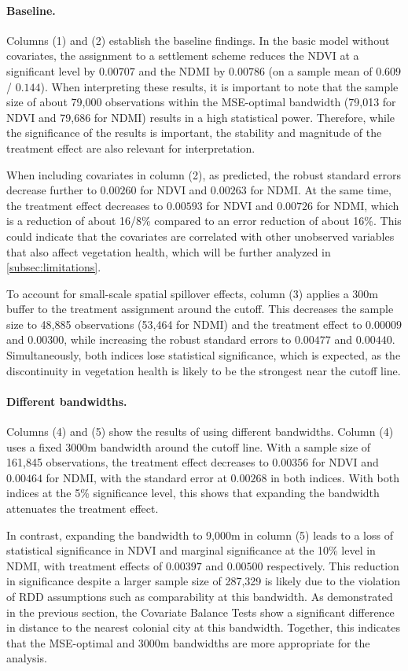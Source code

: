 \paragraph{Baseline.}
Columns (1) and (2) establish the baseline findings.
In the basic model without covariates, the assignment to a settlement scheme reduces the NDVI at a significant level by $0.00707$ and the NDMI by $0.00786$ (on a sample mean of $0.609$ / $0.144$).
When interpreting these results, it is important to note that the sample size of about 79,000 observations within the MSE-optimal bandwidth (79,013 for NDVI and 79,686 for NDMI) results in a high statistical power.
Therefore, while the significance of the results is important, the stability and magnitude of the treatment effect are also relevant for interpretation.

When including covariates in column (2), as predicted, the robust standard errors decrease further to $0.00260$ for NDVI and $0.00263$ for NDMI.
At the same time, the treatment effect decreases to $0.00593$ for NDVI and $0.00726$ for NDMI, which is a reduction of about 16/8\% compared to an error reduction of about 16\%.
This could indicate that the covariates are correlated with other unobserved variables that also affect vegetation health, which will be further analyzed in \cref{subsec:limitations}.

To account for small-scale spatial spillover effects, column (3) applies a 300m buffer to the treatment assignment around the cutoff.
This decreases the sample size to 48,885 observations (53,464 for NDMI) and the treatment effect to $0.00009$ and $0.00300$, while increasing the robust standard errors to $0.00477$ and $0.00440$.
Simultaneously, both indices lose statistical significance, which is expected, as the discontinuity in vegetation health is likely to be the strongest near the cutoff line.

\paragraph{Different bandwidths.} 
Columns (4) and (5) show the results of using different bandwidths.
Column (4) uses a fixed 3000m bandwidth around the cutoff line.
With a sample size of 161,845 observations, the treatment effect decreases to $0.00356$ for NDVI and $0.00464$ for NDMI, with the standard error at $0.00268$ in both indices.
With both indices at the 5\% significance level, this shows that expanding the bandwidth attenuates the treatment effect.

In contrast, expanding the bandwidth to 9,000m in column (5) leads to a loss of statistical significance in NDVI and marginal significance at the 10\% level in NDMI,
with treatment effects of $0.00397$ and $0.00500$ respectively.
This reduction in significance despite a larger sample size of 287,329 is likely due to the violation of RDD assumptions such as comparability at this bandwidth.
As demonstrated in the previous section, the Covariate Balance Tests show a significant difference in distance to the nearest colonial city at this bandwidth.
Together, this indicates that the MSE-optimal and 3000m bandwidths are more appropriate for the analysis.

